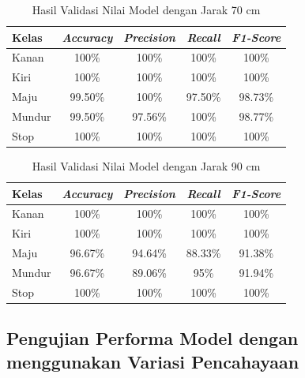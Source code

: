 \begin{table}[ht]
  \caption{Hasil Validasi Nilai Model dengan Jarak 70 cm}
  \label{tb:70cm}
  \centering
  \begin{tabular}{|l|c|c|c|c|}
  \hline
  \rowcolor[HTML]{C0C0C0} 
  \textbf{Kelas} & \textbf{\emph{Accuracy}} & \textbf{\emph{Precision}} & \textbf{\emph{Recall}} & \textbf{\emph{F1-Score}} \\ \hline
  Kanan    & 100\%            & 100\%             & 100\%           & 100\%            \\ \hline
  Kiri     & 100\%          & 100\%           & 100\%           & 100\%           \\ \hline
  Maju      & 99.50\%          & 100\%           & 97.50\%          & 98.73\%          \\ \hline
  Mundur     & 99.50\%            & 97.56\%             & 100\%           & 98.77\%            \\ \hline
  Stop  & 100\%            & 100\%             & 100\%           & 100\%            \\ \hline
  \end{tabular}
\end{table}

\begin{table}[H]
  \caption{Hasil Validasi Nilai Model dengan Jarak 90 cm}
  \label{tb:90cm}
  \centering
  \begin{tabular}{|l|c|c|c|c|}
  \hline
  \rowcolor[HTML]{C0C0C0} 
  \textbf{Kelas} & \textbf{\emph{Accuracy}} & \textbf{\emph{Precision}} & \textbf{\emph{Recall}} & \textbf{\emph{F1-Score}} \\ \hline
  Kanan    & 100\%            & 100\%             & 100\%           & 100\%            \\ \hline
  Kiri     & 100\%          & 100\%           & 100\%           & 100\%           \\ \hline
  Maju      & 96.67\%          & 94.64\%           & 88.33\%          & 91.38\%          \\ \hline
  Mundur     & 96.67\%            & 89.06\%             & 95\%           & 91.94\%            \\ \hline
  Stop  & 100\%            & 100\%             & 100\%           & 100\%            \\ \hline
  \end{tabular}
\end{table}
    
\subsection{Pengujian Performa Model dengan menggunakan Variasi Pencahayaan}

